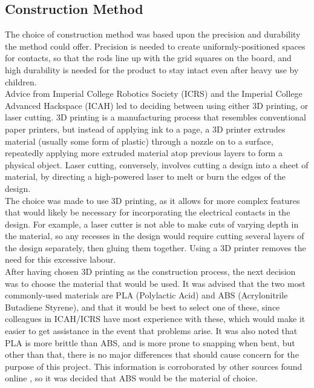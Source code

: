 \subsection{Construction Method}
\label{sec:Construction_Method}
The choice of construction method was based upon the precision and durability the method could offer. Precision is needed to create uniformly-positioned spaces for contacts, so that the rods line up with the grid squares on the board, and high durability is needed for the product to stay intact even after heavy use by children. \\

Advice from Imperial College Robotics Society (ICRS) and the Imperial College Advanced Hackspace (ICAH) led to deciding between using either 3D printing, or laser cutting. 3D printing is a manufacturing process that resembles conventional paper printers, but instead of applying ink to a page, a 3D printer extrudes material  (usually some form of plastic) through a nozzle on to a surface, repeatedly applying more extruded material atop previous layers to  form a physical object. Laser cutting, conversely, involves cutting a design into a sheet of material, by directing a high-powered laser to melt or burn the edges of the design. \\

The choice was made to use 3D printing, as it allows for more complex features that would likely be necessary for incorporating the electrical contacts in the design. For example, a laser cutter is not able to make cuts of varying depth in the material, so any recesses in the design would require cutting several layers of the design separately, then gluing them together. Using a 3D printer removes the need for this excessive labour. \\

After having chosen 3D printing as the construction process, the next decision was to choose the material that would be used. It was advised that the two most commonly-used materials are PLA (Polylactic Acid) and ABS (Acrylonitrile Butadiene Styrene), and that it would be best to select one of these, since colleagues in ICAH/ICRS have most experience with these, which would make it easier to get assistance in the event that problems arise. It was also noted that PLA is more brittle than ABS, and is more prone to snapping when bent, but other than that, there is no major differences that should cause concern for the purpose of this project. This information is corroborated by other sources found online \cite{PLAvsABS47:online}\cite{TheDiffe59:online}, so it was decided that ABS would be the material of choice. \\



